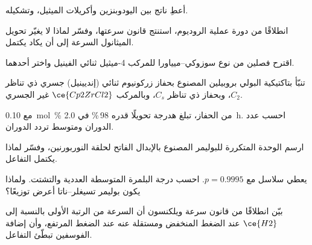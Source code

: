 \begin{exercise}[$\star$]\label{exo:b3:homogeneous-catalysis:4}
أعطِ ناتج  بين اليودوبنزين وأكريلات الميثيل، 
وتشكيله.
\end{exercise}

\begin{exercise}[$\star\star$]\label{exo:b3:homogeneous-catalysis:5}
انطلاقًا من دورة عملية الروديوم، استنتج قانون سرعتها، وفسّر
لماذا لا يغيّر تحويل الميثانول السرعة إلى أن يكاد يكتمل.
\end{exercise}

\begin{exercise}[$\star\star$]\label{exo:b3:homogeneous-catalysis:6}
اقترح فصلين من نوع سوزوكي--ميياورا للمركب 4-ميثيل ثنائي الفينيل واختر أحدهما.
\end{exercise}

\begin{exercise}[$\star\star$]\label{exo:b3:homogeneous-catalysis:7}
تنبّأ بتاكتيكية البولي بروبيلين المصنوع بحفاز زركونيوم ثنائي (إنديينيل) جسري ذي تناظر $C_2$،
وبحفاز ذي تناظر $C_s$، وبالمركب $\ce{Cp2ZrCl2}$ غير الجسري.
\end{exercise}

\begin{exercise}[$\star\star$]\label{exo:b3:homogeneous-catalysis:8}
مع \qty{0.10}{mol\%} من الحفاز، تبلغ هدرجة تحويلًا قدره 98\,\% في \qty{2.0}{h}.
احسب عدد الدوران ومتوسط تردد الدوران.
\end{exercise}

\begin{exercise}[$\star\star$]\label{exo:b3:homogeneous-catalysis:9}
ارسم الوحدة المتكررة للبوليمر المصنوع بالإبدال الفاتح لحلقة
النوربورنين، وفسّر لماذا يكتمل التفاعل.
\end{exercise}

\begin{exercise}[$\star\star\star$]\label{exo:b3:homogeneous-catalysis:10}
يعطي  سلاسل مع $p = 0.9995$. احسب درجة البلمرة
المتوسطة العددية والتشتت. ولماذا يكون بوليمر تسيغلر--ناتا
أعرض توزيعًا؟
\end{exercise}

\begin{exercise}[$\star\star\star$]\label{exo:b3:homogeneous-catalysis:11}
بيّن انطلاقًا من قانون سرعة ويلكنسون أن السرعة من الرتبة الأولى بالنسبة إلى $\ce{H2}$ عند الضغط المنخفض
ومستقلة عنه عند الضغط المرتفع، وأن إضافة الفوسفين تبطّئ
التفاعل.
\end{exercise}

